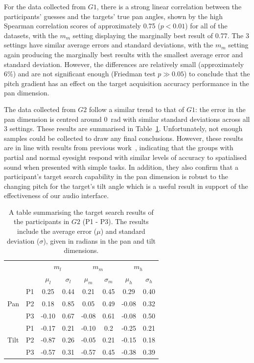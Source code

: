 \documentclass[sigconf, screen=true, anonymous=true]{acmart}
\begin{document}
For the data collected from $G1$, there is a strong linear correlation between the participants' guesses and the targets' true pan angles, shown by the high Spearman correlation scores of approximately 0.75 ($p < 0.01$) for all of the datasets, with the $m_m$ setting displaying the marginally best result of 0.77.
The 3 settings have similar average errors and standard deviations, with the $m_m$ setting again producing the marginally best results with the smallest average error and standard deviation.
However, the differences are relatively small (approximately 6\%) and are not significant enough (Friedman test $p \gg 0.05$) to conclude that the pitch gradient has an effect on the target acquisition accuracy performance in the pan dimension. 

The data collected from $G2$ follow a similar trend to that of $G1$: the error in the pan dimension is centred around \SI{0}{\radian} with similar standard deviations across all 3 settings.
These results are summarised in Table~\ref{tab:vi-results}.
Unfortunately, not enough samples could be collected to draw any final conclusions.
However, these results are in line with results from previous work~\cite{zwiers2001spatial}, indicating that the groups with partial and normal eyesight respond with similar levels of accuracy to spatialised sound when presented with simple tasks. 
In addition, they also confirm that a participant's target search capability in the pan dimension is robust to the changing pitch for the target's tilt angle which is a useful result in support of the effectiveness of our audio interface.

\begin{table}
  \centering
  \caption{A table summarising the target search results of the participants in $G2$ (P1 - P3). The results include the average error ($\mu$) and standard deviation ($\sigma$), given in radians in the pan and tilt dimensions.}\label{tab:vi-results}
  \begin{tabular}{llcccccc}
    \toprule
    \multicolumn{2}{c}{} & \multicolumn{2}{c}{$m_l$} & \multicolumn{2}{c}{$m_m$} & \multicolumn{2}{c}{$m_h$} \\
    \multicolumn{2}{c}{} & $\mu_l$ & $\sigma_l$ & $\mu_m$ & $\sigma_m$ & $\mu_h$ & $\sigma_h$ \\\midrule
         & P1 &  0.25 & 0.44 &  0.21 & 0.45 &  0.29 & 0.40 \\%
    Pan  & P2 &  0.18 & 0.85 &  0.05 & 0.49 & -0.08 & 0.32 \\%
         & P3 & -0.10 & 0.67 & -0.08 & 0.61 & -0.08 & 0.50 \\ \midrule
         & P1 & -0.17 & 0.21 & -0.10 & 0.2  & -0.25 & 0.21 \\%
    Tilt & P2 & -0.87 & 0.26 & -0.05 & 0.21 & -0.15 & 0.18 \\%
         & P3 & -0.57 & 0.31 & -0.57 & 0.45 & -0.38 & 0.39 \\%
    \bottomrule
  \end{tabular}
\end{table}
\end{document}
